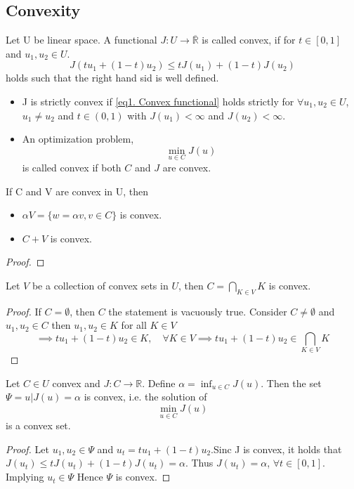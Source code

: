 \subsection{Convexity}
\begin{definition}
	Let U be linear space. A functional $J:U\rightarrow \overline{\mathbb{R}}$ is called convex, if for $t\in[0,1]$ and $u_1, u_2 \in U$.
	\begin{equation}
		J(tu_1+(1-t)u_2)\leq t J(u_1)+(1-t)J(u_2) \label{eq1. Convex functional}
	\end{equation}
	holds such that the right hand sid is well defined.
	\begin{itemize}
	\item 	J is strictly convex if \eqref{eq1. Convex functional} holds strictly for $\forall u_1, u_2 \in U$, $u_1\neq u_2$ and $t \in (0,1)$ with $J(u_1)<\infty$ and $J(u_2)< \infty$.
	\item An optimization problem, 
	\[
		\min_{u \in C} J(u)
	\] is called convex if both $C$ and $J$ are convex.
	\end{itemize}
\end{definition}

\begin{lemma}
	If C and V are convex in U, then
	\begin{itemize}
		\item  $\alpha V = \lbrace w = \alpha v, v\in C \rbrace$ is convex.
		\item $C+V$ is convex.
	\end{itemize}
	\begin{proof}
		
	\end{proof}
\end{lemma}


\begin{lemma}
	Let $V$ be a collection of convex sets in $U$, then $C=\bigcap_{K \in V} K$ is convex.
	\begin{proof}
			If $C = \emptyset$, then $C$ the statement is vacuously true. Consider $C\neq \emptyset$ and $u_1, u_2 \in C$ then $u_1, u_2 \in K$ for all $K \in V$
			\[
			\implies tu_1+(1-t)u_2 \in K, \quad \forall K \in V \implies tu_1+(1-t)u_2 \in \bigcap_{K \in V} K 
			\]
	\end{proof}
\end{lemma}

\begin{lemma}
		Let $C\in U$ convex and $J: C \rightarrow \mathbb{R}$. Define $\alpha=\inf_{u\in C} J(u)$. Then the set $\Psi = {u | J(u)=\alpha}$ is convex, i.e. the solution of 
		\[
			\min_{u \in C} J(u)
		\] 
		is a convex set.
		\begin{proof}
			Let $u_1, u_2 \in \Psi$ and $u_t=tu_1+(1-t)u_2$.Sinc J is convex, it holds that
			$J(u_t)\leq t J(u_t)+(1-t)J(u_t)=\alpha$. Thus $J(u_t)=\alpha$, $\forall t \in [0,1]$. Implying $u_t \in \Psi$ Hence $\Psi$ is convex.
		\end{proof}
\end{lemma}

